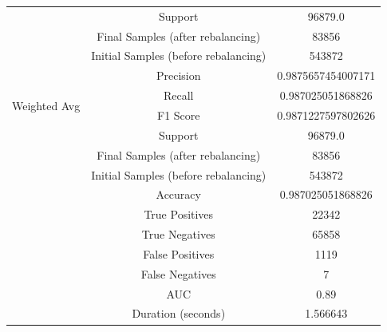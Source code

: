 \begin{longtable}{|c|c|c|}
 & Support & 96879.0 \\
 & Final Samples (after rebalancing) & 83856 \\
 & Initial Samples (before rebalancing) & 543872 \\
\hline
\multirow{4}{*}{Weighted Avg} & Precision & 0.9875657454007171 \\
 & Recall & 0.987025051868826 \\
 & F1 Score & 0.9871227597802626 \\
 & Support & 96879.0 \\
 & Final Samples (after rebalancing) & 83856 \\
 & Initial Samples (before rebalancing) & 543872 \\
\hline
& Accuracy & 0.987025051868826 \\ \hline
& True Positives & 22342 \\ \hline
& True Negatives & 65858 \\ \hline
& False Positives & 1119 \\ \hline
& False Negatives & 7 \\ \hline
& AUC & 0.89 \\ \hline
& Duration (seconds) & 1.566643 \\ \hline
\end{longtable}


